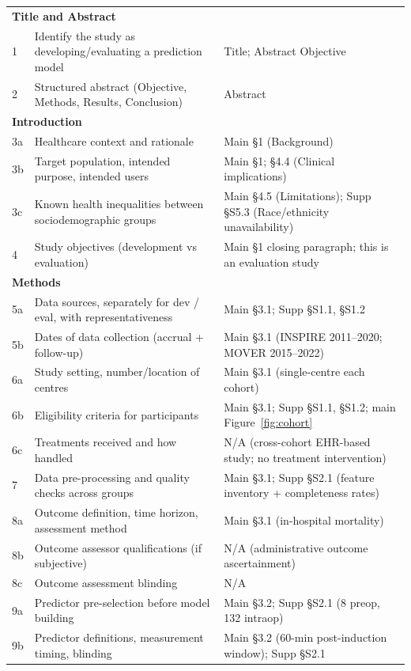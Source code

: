 \documentclass[11pt,a4paper]{article}
\begin{document}
\begin{longtable}{p{}p{}p{}}
\multicolumn{3}{l}{\textbf{Title and Abstract}} \\
1   & Identify the study as developing/evaluating a prediction model & Title; Abstract Objective \\
2   & Structured abstract (Objective, Methods, Results, Conclusion) & Abstract \\
\midrule
\multicolumn{3}{l}{\textbf{Introduction}} \\
3a  & Healthcare context and rationale & Main §1 (Background) \\
3b  & Target population, intended purpose, intended users & Main §1; §4.4 (Clinical implications) \\
3c  & Known health inequalities between sociodemographic groups & Main §4.5 (Limitations); Supp §S5.3 (Race/ethnicity unavailability) \\
4   & Study objectives (development vs evaluation) & Main §1 closing paragraph; this is an evaluation study \\
\midrule
\multicolumn{3}{l}{\textbf{Methods}} \\
5a  & Data sources, separately for dev / eval, with representativeness & Main §3.1; Supp §S1.1, §S1.2 \\
5b  & Dates of data collection (accrual + follow-up) & Main §3.1 (INSPIRE 2011--2020; MOVER 2015--2022) \\
6a  & Study setting, number/location of centres & Main §3.1 (single-centre each cohort) \\
6b  & Eligibility criteria for participants & Main §3.1; Supp §S1.1, §S1.2; main Figure~\ref{fig:cohort} \\
6c  & Treatments received and how handled & N/A (cross-cohort EHR-based study; no treatment intervention) \\
7   & Data pre-processing and quality checks across groups & Main §3.1; Supp §S2.1 (feature inventory + completeness rates) \\
8a  & Outcome definition, time horizon, assessment method & Main §3.1 (in-hospital mortality) \\
8b  & Outcome assessor qualifications (if subjective) & N/A (administrative outcome ascertainment) \\
8c  & Outcome assessment blinding & N/A \\
9a  & Predictor pre-selection before model building & Main §3.2; Supp §S2.1 (8 preop, 132 intraop) \\
9b  & Predictor definitions, measurement timing, blinding & Main §3.2 (60-min post-induction window); Supp §S2.1 \\

\end{longtable}
\end{document}
